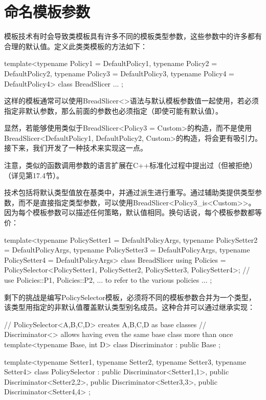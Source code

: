 \section{命名模板参数}
模板技术有时会导致类模板具有许多不同的模板类型参数，这些参数中的许多都有合理的默认值。定义此类类模板的方法如下：

\begin{cpp}
template<typename Policy1 = DefaultPolicy1,
		typename Policy2 = DefaultPolicy2,
		typename Policy3 = DefaultPolicy3,
		typename Policy4 = DefaultPolicy4>
class BreadSlicer {
	...
};
\end{cpp}

这样的模板通常可以使用BreadSlicer<>语法与默认模板参数值一起使用，若必须指定非默认参数，那么前面的参数也必须指定（即使可能有默认值）。

显然，若能够使用类似于BreadSlicer<Policy3 = Custom>的构造，而不是使用BreadSlicer<DefaultPolicy1, DefaultPolicy2, Custom>的构造，将会更有吸引力。接下来，我们开发了一种技术来实现这一点。

\begin{notice}
注意，类似的函数调用参数的语言扩展在C++标准化过程中提出过（但被拒绝）（详见第17.4节）。
\end{notice}

技术包括将默认类型值放在基类中，并通过派生进行重写。通过辅助类提供类型参数，而不是直接指定类型参数，可以使用BreadSlicer<Policy3\_is<Custom>{}>。因为每个模板参数可以描述任何策略，默认值相同。换句话说，每个模板参数都等价：

\begin{cpp}
template<typename PolicySetter1 = DefaultPolicyArgs,
		typename PolicySetter2 = DefaultPolicyArgs,
		typename PolicySetter3 = DefaultPolicyArgs,
		typename PolicySetter4 = DefaultPolicyArgs>
class BreadSlicer {
	using Policies = PolicySelector<PolicySetter1, PolicySetter2,
									PolicySetter3, PolicySetter4>;
	// use Policies::P1, Policies::P2, ... to refer to the various policies
	...
};
\end{cpp}

剩下的挑战是编写PolicySelector模板，必须将不同的模板参数合并为一个类型，该类型用指定的非默认值覆盖默认类型别名成员。这种合并可以通过继承实现：

\begin{cpp}
// PolicySelector<A,B,C,D> creates A,B,C,D as base classes
// Discriminator<> allows having even the same base class more than once
template<typename Base, int D>
class Discriminator : public Base {
};

template<typename Setter1, typename Setter2,
		typename Setter3, typename Setter4>
class PolicySelector : public Discriminator<Setter1,1>,
						public Discriminator<Setter2,2>,
						public Discriminator<Setter3,3>,
						public Discriminator<Setter4,4> {
};
\end{cpp}

